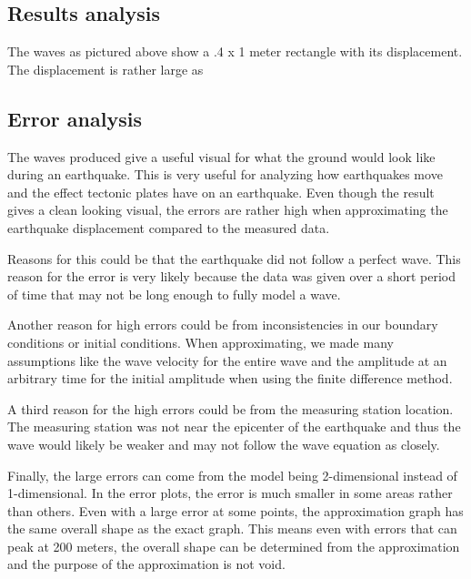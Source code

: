 \documentclass[conf]{new-aiaa}
\begin{document}
\subsection{Results analysis}
The waves as pictured above show a .4 x 1 meter rectangle with its displacement. The displacement is rather large as 

\subsection{Error analysis}
The waves produced give a useful visual for what the ground would look like during an earthquake. This is very useful for analyzing how earthquakes move and the effect tectonic plates have on an earthquake. Even though the result gives a clean looking visual, the errors are rather high when approximating the earthquake displacement compared to the measured data.

Reasons for this could be that the earthquake did not follow a perfect wave. This reason for the error is very likely because the data was given over a short period of time that may not be long enough to fully model a wave. 


Another reason for high errors could be from inconsistencies in our boundary conditions or initial conditions. When approximating, we made many assumptions like the wave velocity for the entire wave and the amplitude at an arbitrary time for the initial amplitude when using the finite difference method.

A third reason for the high errors could be from the measuring station location. The measuring station was not near the epicenter of the earthquake and thus the wave would likely be weaker and may not follow the wave equation as closely. 

Finally, the large errors can come from the model being 2-dimensional instead of 1-dimensional. In the error plots, the error is much smaller in some areas rather than others. Even with a large error at some points, the approximation graph has the same overall shape as the exact graph. This means even with errors that can peak at 200 meters, the overall shape can be determined from the approximation and the purpose of the approximation is not void. 
\end{document}
